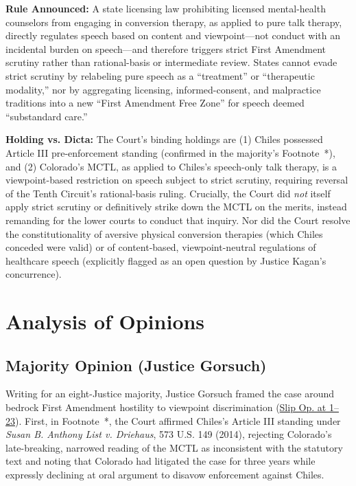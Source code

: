 \documentclass[12pt]{article}
\begin{document}
\textbf{Rule Announced:} A state licensing law prohibiting licensed mental-health counselors from engaging in conversion therapy, as applied to pure talk therapy, directly regulates speech based on content and viewpoint---not conduct with an incidental burden on speech---and therefore triggers strict First Amendment scrutiny rather than rational-basis or intermediate review. States cannot evade strict scrutiny by relabeling pure speech as a ``treatment'' or ``therapeutic modality,'' nor by aggregating licensing, informed-consent, and malpractice traditions into a new ``First Amendment Free Zone'' for speech deemed ``substandard care.''

\textbf{Holding vs. Dicta:} The Court's binding holdings are (1) Chiles possessed Article III pre-enforcement standing (confirmed in the majority's Footnote~*), and (2) Colorado's MCTL, as applied to Chiles's speech-only talk therapy, is a viewpoint-based restriction on speech subject to strict scrutiny, requiring reversal of the Tenth Circuit's rational-basis ruling. Crucially, the Court did \textit{not} itself apply strict scrutiny or definitively strike down the MCTL on the merits, instead remanding for the lower courts to conduct that inquiry. Nor did the Court resolve the constitutionality of aversive physical conversion therapies (which Chiles conceded were valid) or of content-based, viewpoint-neutral regulations of healthcare speech (explicitly flagged as an open question by Justice Kagan's concurrence).

\section{Analysis of Opinions}

\subsection{Majority Opinion (Justice Gorsuch)}

Writing for an eight-Justice majority, Justice Gorsuch framed the case around bedrock First Amendment hostility to viewpoint discrimination (\href{https://www.supremecourt.gov/opinions/25pdf/24-539_fd9g.pdf}{Slip Op. at 1--23}). First, in Footnote~*, the Court affirmed Chiles's Article III standing under \textit{Susan B. Anthony List v. Driehaus}, 573 U.S. 149 (2014), rejecting Colorado's late-breaking, narrowed reading of the MCTL as inconsistent with the statutory text and noting that Colorado had litigated the case for three years while expressly declining at oral argument to disavow enforcement against Chiles.
\end{document}
